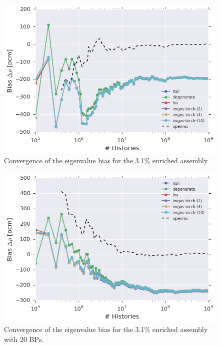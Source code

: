 \begin{figure}[h!]
\centering
\includegraphics[width=0.88\linewidth]{figures/results/convergence/assm-31/keff-bias-evo}
\vspace{2mm}
\caption[Eigenvalue bias convergence with MC histories]{Convergence of the eigenvalue bias for the 3.1\% enriched assembly.}
\label{fig:chap11-assm-3.1-eigenvalue-converge}
\end{figure}

\begin{figure}[h!]
\centering
\includegraphics[width=0.88\linewidth]{figures/results/convergence/assm-31-20BPs/keff-bias-evo}
\vspace{2mm}
\caption[Eigenvalue bias convergence with MC histories]{Convergence of the eigenvalue bias for the 3.1\% enriched assembly with 20 \acp{BP}.}
\label{fig:chap11-assm-3.1-20BPs-eigenvalue-converge}
\end{figure}

